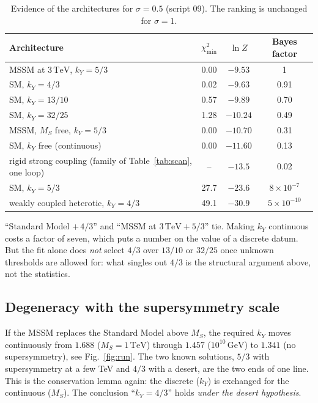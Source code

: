 \documentclass[11pt,a4paper]{article}
\newcommand{\kY}{k_Y}
\newcommand{\GeV}{\,\mathrm{GeV}}
\newcommand{\TeV}{\,\mathrm{TeV}}
\begin{document}
\begin{table}[h]\centering
\caption{Evidence of the architectures for $\sigma=0.5$ (script 09). The ranking is unchanged for $\sigma=1$.}\label{tab:bayes}
\begin{tabular}{lccc}\toprule
Architecture & $\chi^2_{\min}$ & $\ln Z$ & Bayes factor\\\midrule
MSSM at $3\TeV$, $\kY=5/3$ & 0.00 & $-9.53$ & 1\\
SM, $\kY=4/3$ & 0.02 & $-9.63$ & 0.91\\
SM, $\kY=13/10$ & 0.57 & $-9.89$ & 0.70\\
SM, $\kY=32/25$ & 1.28 & $-10.24$ & 0.49\\
MSSM, $M_S$ free, $\kY=5/3$ & 0.00 & $-10.70$ & 0.31\\
SM, $\kY$ free (continuous) & 0.00 & $-11.60$ & 0.13\\
rigid strong coupling (family of Table~\ref{tab:scan}, one loop) & -- & $-13.5$ & 0.02\\
SM, $\kY=5/3$ & 27.7 & $-23.6$ & $8\times10^{-7}$\\
weakly coupled heterotic, $\kY=4/3$ & 49.1 & $-30.9$ & $5\times10^{-10}$\\\bottomrule
\end{tabular}\end{table}

``Standard Model $+\,4/3$'' and ``MSSM at $3\TeV+5/3$'' tie. Making $\kY$ continuous costs a factor of seven, which puts a
number on the value of a discrete datum. But the fit alone does \emph{not} select $4/3$ over $13/10$ or $32/25$ once unknown
thresholds are allowed for: what singles out $4/3$ is the structural argument above, not the statistics.

\subsection{Degeneracy with the supersymmetry scale}\label{sec:degeneracy}
If the MSSM replaces the Standard Model above $M_S$, the required $\kY$ moves continuously from $1.688$ ($M_S=1\TeV$) through
$1.457$ ($10^{10}\GeV$) to $1.341$ (no supersymmetry), see Fig.~\ref{fig:run}. The two known solutions, $5/3$ with supersymmetry
at a few TeV and $4/3$ with a desert, are the two ends of one line. This is the conservation lemma again: the discrete ($\kY$)
is exchanged for the continuous ($M_S$). The conclusion ``$\kY=4/3$'' holds \emph{under the desert hypothesis}.
\end{document}
